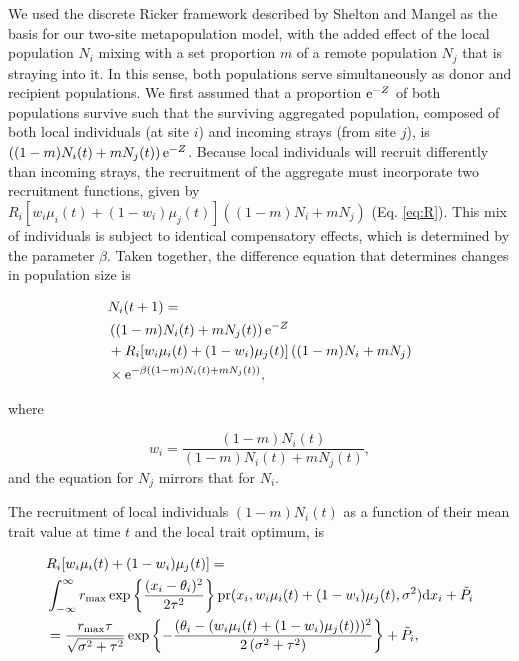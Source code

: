 \documentclass{revtex4}
\begin{document}
We used the discrete Ricker framework described by Shelton and Mangel \citep{Shelton:2011eq} as the basis for our two-site metapopulation model, with the added effect of the local population $N_i$ mixing with a set proportion $m$ of a remote population $N_j$ that is straying into it.
In this sense, both populations serve simultaneously as donor and recipient populations.
We first assumed that a proportion ${\rm e}^{-Z}$ of both populations survive such that the surviving aggregated population, composed of both local individuals (at site $i$) and incoming strays (from site $j$), is $\left((1-m)N_i(t) + m N_j(t) \right){\rm e}^{-Z}$.
Because local individuals will recruit differently than incoming strays, the recruitment of the aggregate must incorporate two recruitment functions, given by $R_i[w_i\mu_i(t) + (1-w_i)\mu_j(t)]\left((1-m)N_i + mN_j\right)$ (Eq. \ref{eq:R}).
This mix of individuals is subject to identical compensatory effects, which is determined by the parameter $\beta$.
Taken together, the difference equation that determines changes in population size is

\begin{align}
  &N_i(t+1) = \\ \nonumber
  &\left((1-m)N_i(t) + m N_j(t) \right){\rm e}^{-Z} \\ \nonumber
  &+ R_i[w_i\mu_i(t) + (1-w_i)\mu_j(t)]\left((1-m)N_i + mN_j\right) \\ \nonumber
  &\times {\rm e}^{-\beta ((1-m)N_i(t) + m N_j(t))},
  \label{eq:N}
\end{align}

\noindent where

\begin{equation}
w_i=\frac{(1-m)N_i(t)}{(1-m) N_i(t) + m N_j(t)},
\end{equation} 
and the equation for $N_j$ mirrors that for $N_i$.

The recruitment of local individuals $(1-m)N_i(t)$ as a function of their mean trait value at time $t$ and the local trait optimum, is

\begin{align}
  &R_i[w_i\mu_i(t) + (1-w_i)\mu_j(t)] = \\ \nonumber
  &\int_{-\infty}^\infty r_{\rm max}\exp\left\{\frac{(x_i-\theta_i)^2}{2\tau^2}\right\} {\rm pr}(x_i,w_i\mu_i(t) + (1-w_i)\mu_j(t),\sigma^2) {\rm d}x_i +\tilde{P}_i\\ \nonumber
  &= \frac{r_{\rm max} \tau  }{\sqrt{\sigma ^2+\tau ^2}}\exp\left\{-\frac{(\theta_i-(w_i\mu_i(t) + (1-w_i)\mu_j(t)))^2}{2 \left(\sigma ^2+\tau ^2\right)}\right\} +\tilde{P}_i,
\end{align}
\end{document}

